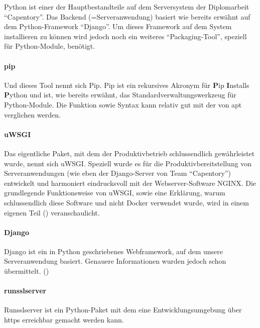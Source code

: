 Python ist einer der Hauptbestandteile auf dem Serversystem der
Diplomarbeit ``Capentory''. Das Backend (=Serveranwendung) basiert wie
bereits erwähnt auf dem Python-Framework ``Django''. Um dieses Framework
auf dem System installieren zu können wird jedoch noch ein weiteres
``Packaging-Tool'', speziell für Python-Module, benötigt.

\hypertarget{pip}{%
\paragraph{pip}\label{pip}}

Und dieses Tool nennt sich Pip. Pip ist ein rekursives Akronym für
\textbf{P}ip \textbf{I}nstalls \textbf{P}ython und ist, wie bereits
erwähnt, das Standardverwaltungswerkzeug für Python-Module. Die Funktion
sowie Syntax kann relativ gut mit der von apt verglichen werden.

\hypertarget{uwsgi}{%
\paragraph{uWSGI}\label{uwsgi}}

Das eigentliche Paket, mit dem der Produktivbetrieb schlussendlich
gewährleistet wurde, nennt sich uWSGI. Speziell wurde es für die
Produktivbereitstellung von Serveranwendungen (wie eben der
Django-Server von Team ``Capentory'') entwickelt und harmoniert
eindrucksvoll mit der Webserver-Software NGINX. Die grundlegende
Funktionsweise von uWSGI, sowie eine Erklärung, warum schlussendlich
diese Software und nicht Docker verwendet wurde, wird in einem eigenen
Teil () veranschaulicht.

\hypertarget{django}{%
\paragraph{Django}\label{django}}

Django ist ein in Python geschriebenes Webframework, auf dem unsere
Serveranwendung basiert. Genauere Informationen wurden jedoch schon
übermittelt.
()

\hypertarget{runsslserver}{%
\paragraph{runsslserver}\label{runsslserver}}

Runsslserver ist ein Python-Paket mit dem eine Entwicklungsumgebung über
https erreichbar gemacht werden kann.

